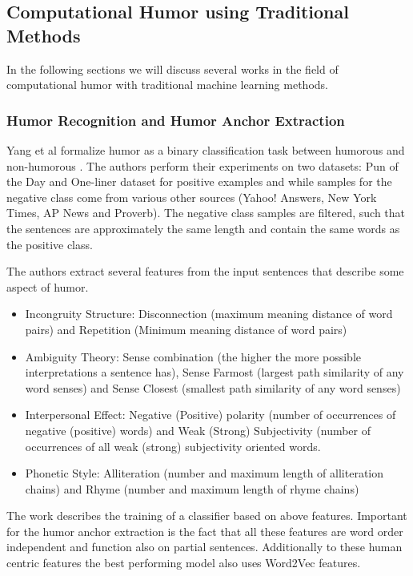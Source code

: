 \documentclass[draft,final,oneside]{vutinfth} %
\begin{document}
\subsection{Computational Humor using Traditional Methods}

In the following sections we will discuss several works in the field of computational humor with traditional machine learning methods.

\subsubsection{Humor Recognition and Humor Anchor Extraction}

Yang et al formalize humor as a binary classification task between humorous and non-humorous \cite{Yang2015HumorRA}. The authors perform their experiments on two datasets: Pun of the Day and One-liner dataset for positive examples and while samples for the negative class come from various other sources (Yahoo! Answers, New York Times, AP News and Proverb). The negative class samples are filtered, such that the sentences are approximately the same length and contain the same words as the positive class.

The authors extract several features from the input sentences that describe some aspect of humor.

\begin{itemize}
\item Incongruity Structure: Disconnection (maximum meaning distance of word pairs) and Repetition (Minimum meaning distance of word pairs)
\item Ambiguity Theory: Sense combination (the higher the more possible interpretations a sentence has), Sense Farmost (largest path similarity of any word senses) and Sense Closest (smallest path similarity of any word senses)
\item Interpersonal Effect: Negative (Positive) polarity (number of occurrences of negative (positive) words) and Weak (Strong) Subjectivity (number of occurrences of all weak (strong) subjectivity oriented words.
\item Phonetic Style: Alliteration (number and maximum length of alliteration chains) and Rhyme (number and maximum length of rhyme chains)
\end{itemize}

The work describes the training of a classifier based on above features. Important for the humor anchor extraction is the fact that all these features are word order independent and function also on partial sentences. Additionally to these human centric features the best performing model also uses Word2Vec features.
\end{document}
